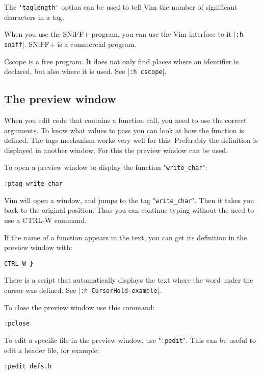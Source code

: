 The \verb!'taglength'! option can be used to tell Vim the number of significant characters in a tag.

When you use the SNiFF+ program, you can use the Vim interface to it |\verb!:h sniff!|.
SNiFF+ is a commercial program.

Cscope is a free program.
It does not only find places where an identifier is declared, but also where it is used.
See |\verb!:h cscope!|.
\subsection{The preview window}
When you edit code that contains a function call, you need to use the correct arguments.
To know what values to pass you can look at how the function is defined.
The tags mechanism works very well for this.
Preferably the definition is displayed in another window.
For this the preview window can be used.

To open a preview window to display the function "\verb!write_char!":

\begin{Verbatim}[samepage=true]
 :ptag write_char
\end{Verbatim}

Vim will open a window, and jumps to the tag "\verb!write_char!".
Then it takes you back to the original position.
Thus you can continue typing without the need to use a CTRL-W command.

If the name of a function appears in the text, you can get its definition in the preview window with:

\begin{Verbatim}[samepage=true]
 CTRL-W }
\end{Verbatim}

There is a script that automatically displays the text where the word under the cursor was defined.
See |\verb!:h CursorHold-example!|.

To close the preview window use this command:

\begin{Verbatim}[samepage=true]
 :pclose
\end{Verbatim}

To edit a specific file in the preview window, use "\verb!:pedit!".
This can be useful to edit a header file, for example:

\begin{Verbatim}[samepage=true]
 :pedit defs.h
\end{Verbatim}

